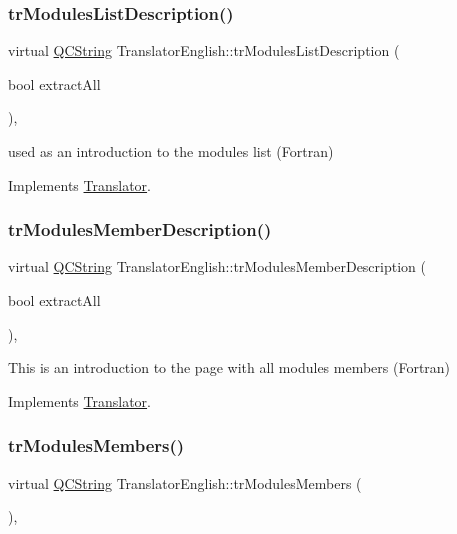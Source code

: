 \subsubsection{\texorpdfstring{trModulesListDescription()}{trModulesListDescription()}}
{\footnotesize\ttfamily virtual \mbox{\hyperlink{class_q_c_string}{Q\+C\+String}} Translator\+English\+::tr\+Modules\+List\+Description (\begin{DoxyParamCaption}\item[{bool}]{extract\+All }\end{DoxyParamCaption})\hspace{0.3cm}{\ttfamily [inline]}, {\ttfamily [virtual]}}

used as an introduction to the modules list (Fortran) 

Implements \mbox{\hyperlink{class_translator}{Translator}}.

\mbox{\label{class_translator_english_a48b2e56985eff6c8ddbf04b51da1bcb0}} 
\subsubsection{\texorpdfstring{trModulesMemberDescription()}{trModulesMemberDescription()}}
{\footnotesize\ttfamily virtual \mbox{\hyperlink{class_q_c_string}{Q\+C\+String}} Translator\+English\+::tr\+Modules\+Member\+Description (\begin{DoxyParamCaption}\item[{bool}]{extract\+All }\end{DoxyParamCaption})\hspace{0.3cm}{\ttfamily [inline]}, {\ttfamily [virtual]}}

This is an introduction to the page with all modules members (Fortran) 

Implements \mbox{\hyperlink{class_translator}{Translator}}.

\mbox{\label{class_translator_english_abaaef8c394bc23f38af51c8865d8a058}} 
\subsubsection{\texorpdfstring{trModulesMembers()}{trModulesMembers()}}
{\footnotesize\ttfamily virtual \mbox{\hyperlink{class_q_c_string}{Q\+C\+String}} Translator\+English\+::tr\+Modules\+Members (\begin{DoxyParamCaption}{ }\end{DoxyParamCaption})\hspace{0.3cm}{\ttfamily [inline]}, {\ttfamily [virtual]}}

